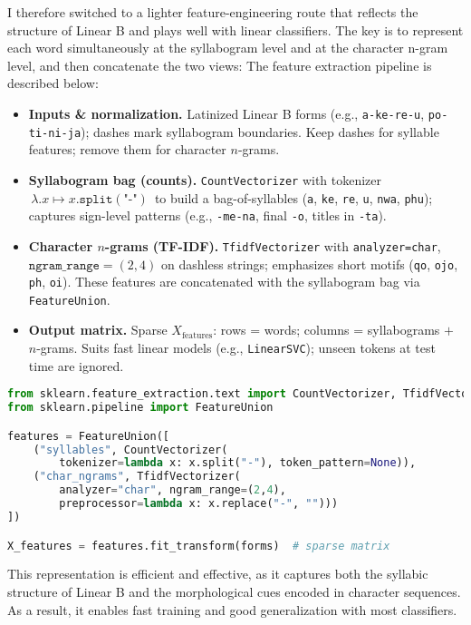 I therefore switched to a lighter feature-engineering route that reflects the structure of Linear B and plays well with linear classifiers.
The key is to represent each word simultaneously at the syllabogram level and at the character n-gram level, and then concatenate the two views:
The feature extraction pipeline is described below:
\begin{itemize}[leftmargin=2em]
  \item \textbf{Inputs \& normalization.} Latinized Linear B forms (e.g., \texttt{a-ke-re-u}, \texttt{po-ti-ni-ja}); dashes mark syllabogram boundaries. Keep dashes for syllable features; remove them for character \(n\)-grams.
  \item \textbf{Syllabogram bag (counts).} \texttt{CountVectorizer} with tokenizer \(\,\lambda.x \mapsto x.\texttt{split}(\texttt{"-"})\,\) to build a bag-of-syllables (\texttt{a}, \texttt{ke}, \texttt{re}, \texttt{u}, \texttt{nwa}, \texttt{phu}); captures sign-level patterns (e.g., \texttt{-me-na}, final \texttt{-o}, titles in \texttt{-ta}).
  \item \textbf{Character \(n\)-grams (TF-IDF).} \texttt{TfidfVectorizer} with \texttt{analyzer=char}, \(\texttt{ngram\_range}=(2,4)\) on dashless strings; emphasizes short motifs (\texttt{qo}, \texttt{ojo}, \texttt{ph}, \texttt{oi}). These features are concatenated with the syllabogram bag via \texttt{FeatureUnion}.
  \item \textbf{Output matrix.} Sparse \(X_{\text{features}}\): rows = words; columns = syllabograms \(+\) \(n\)-grams. Suits fast linear models (e.g., \texttt{LinearSVC}); unseen tokens at test time are ignored.
\end{itemize}

\begin{lstlisting}[language=Python, caption={Syllabogram counts + char \(n\)-gram TF-IDF (concatenated) and transform}, breaklines=true]
from sklearn.feature_extraction.text import CountVectorizer, TfidfVectorizer
from sklearn.pipeline import FeatureUnion

features = FeatureUnion([
    ("syllables", CountVectorizer(
        tokenizer=lambda x: x.split("-"), token_pattern=None)),
    ("char_ngrams", TfidfVectorizer(
        analyzer="char", ngram_range=(2,4),
        preprocessor=lambda x: x.replace("-", "")))
])

X_features = features.fit_transform(forms)  # sparse matrix
\end{lstlisting}

This representation is efficient and effective, as it captures both the syllabic structure of Linear B and the morphological cues encoded in character sequences.
As a result, it enables fast training and good generalization with most classifiers.

